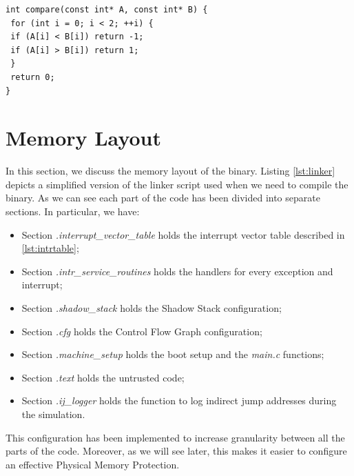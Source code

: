 \begin{lstlisting}[style=CStyle, caption= Comparison for binary search, label={lst:binsearch}]
int compare(const int* A, const int* B) {
 for (int i = 0; i < 2; ++i) {
 if (A[i] < B[i]) return -1;
 if (A[i] > B[i]) return 1;
 }
 return 0;
}
\end{lstlisting}

\section{Memory Layout}
\label{sec:layout}

In this section, we discuss the memory layout of the binary. Listing
\ref{lst:linker} depicts a simplified version of the linker script used when we
need to compile the binary. As we can see each part of the code has been divided
into separate sections. In particular, we have:
\begin{itemize}[noitemsep]
  \item Section \textit{.interrupt\_vector\_table} holds the interrupt vector
    table described in \ref{lst:intrtable};

  \item Section \textit{.intr\_service\_routines} holds the handlers for every
    exception and interrupt;

  \item Section \textit{.shadow\_stack} holds the Shadow Stack configuration;

  \item Section \textit{.cfg} holds the Control Flow Graph configuration;

  \item Section \textit{.machine\_setup} holds the boot setup and the \textit{main.c}
    functions;

  \item Section \textit{.text} holds the untrusted code;

  \item Section \textit{.ij\_logger} holds the function to log indirect jump
    addresses during the simulation.
\end{itemize}

This configuration has been implemented to increase granularity between all the parts
of the code. Moreover, as we will see later, this makes it easier to configure
an effective Physical Memory Protection.

